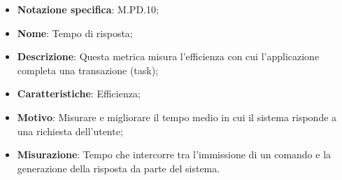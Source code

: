 \begin{itemize}
    \item \textbf{Notazione specifica}: M.PD.10;
    \item \textbf{Nome}: Tempo di risposta;
    \item \textbf{Descrizione}: Questa metrica misura l'efficienza con cui l'applicazione completa una transazione (task);
    \item \textbf{Caratteristiche}: Efficienza;
    \item \textbf{Motivo}: Misurare e migliorare il tempo medio in cui il sistema risponde a una richiesta dell'utente;
    \item \textbf{Misurazione}: Tempo che intercorre tra l’immissione di un comando e la generazione della risposta da parte del sistema.
\end{itemize}
